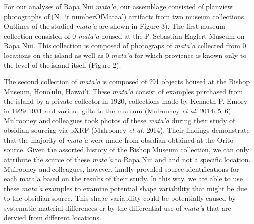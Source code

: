 \documentclass[]{article}
\begin{document}
For our analyses of Rapa Nui \emph{mata'a}, our assemblage consisted of
planview photographs of (N=`r numberOfMataa') artifacts from two museum
collections. Outlines of the studied \emph{mata'a} are shown in Figure
3). The first museum collection consisted of 0 \emph{mata'a} housed at
the P. Sebastian Englert Museum on Rapa Nui. This collection is composed
of photograps of \emph{mata'a} collected from 0 locations on the island
as well as 0 \emph{mata'a} for which provience is known only to the
level of the island itself (Figure 2).

The second collection of \emph{mata'a} is composed of 291 objects housed
at the Bishop Museum, Honolulu, Hawai'i. These \emph{mata'a} consist of
examples purchased from the island by a private collector in 1920,
collections made by Kenneth P. Emory in 1929-1931 and various gifts to
the museum (Mulrooney \emph{et al.} 2014: 5--6). Mulrooney and
colleagues took photos of these \emph{mata'a} during their study of
obsidian sourcing via pXRF (Mulrooney \emph{et al.} 2014). Their
findings demonstrate that the majority of \emph{mata'a} were made from
obsidian obtained at the Orito source. Given the assorted history of the
Bishop Museum collection, we can only attribute the source of these
\emph{mata'a} to Rapa Nui and and not a specific location. Mulrooney and
colleagues, however, kindly provided source identifications for each
mata'a based on the results of their study. In this way, we are able to
use these \emph{mata'a} examples to examine potential shape variability
that might be due to the obsidian source. This shape variability could
be potentially caused by systematic material differences or by the
differential use of \emph{mata'a} that are dervied from different
locations.
\end{document}
